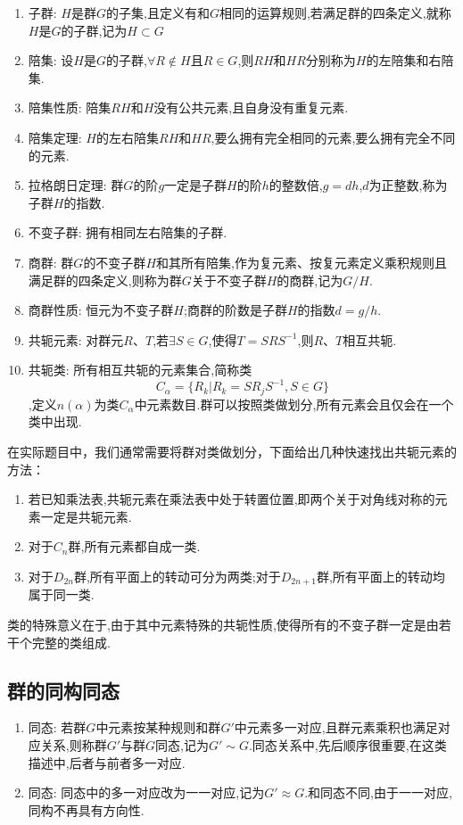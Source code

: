\documentclass{ctexart}
\begin{document}
\begin{enumerate}
    \item 子群: $H$是群$G$的子集,且定义有和$G$相同的运算规则,若满足群的四条定义,就称$H$是$G$的子群,记为$H\subset G$
    \item 陪集: 设$H$是$G$的子群,$\forall R \notin H$且$R\in G$,则$RH$和$HR$分别称为$H$的左陪集和右陪集.
    \item 陪集性质: 陪集$RH$和$H$没有公共元素,且自身没有重复元素.
    \item 陪集定理: $H$的左右陪集$RH$和$HR$,要么拥有完全相同的元素,要么拥有完全不同的元素.
    \item 拉格朗日定理: 群$G$的阶$g$一定是子群$H$的阶$h$的整数倍,$g=dh$,$d$为正整数,称为子群$H$的指数.
    \item 不变子群: 拥有相同左右陪集的子群.
    \item 商群: 群$G$的不变子群$H$和其所有陪集,作为复元素、按复元素定义乘积规则且满足群的四条定义,则称为群$G$关于不变子群$H$的商群,记为$G/H$.
    \item 商群性质: 恒元为不变子群$H$;商群的阶数是子群$H$的指数$d=g/h$.
    \item 共轭元素: 对群元$R$、$T$,若$\exists S\in G$,使得$T=SRS^{-1}$,则$R$、$T$相互共轭.
    \item 共轭类: 所有相互共轭的元素集合,简称类\[C_{\alpha}= \{ R_{k}|R_{k}=SR_{j}S^{-1},S\in G \}\],定义$n(\alpha)$为类$C_{\alpha}$中元素数目.群可以按照类做划分,所有元素会且仅会在一个类中出现.
\end{enumerate}

在实际题目中，我们通常需要将群对类做划分，下面给出几种快速找出共轭元素的方法：
\begin{enumerate}
    \item 若已知乘法表,共轭元素在乘法表中处于转置位置,即两个关于对角线对称的元素一定是共轭元素.
    \item 对于$C_{n}$群,所有元素都自成一类.
    \item 对于$D_{2n}$群,所有平面上的转动可分为两类;对于$D_{2n+1}$群,所有平面上的转动均属于同一类.
\end{enumerate}

类的特殊意义在于,由于其中元素特殊的共轭性质,使得所有的不变子群一定是由若干个完整的类组成.

\subsection{群的同构同态}

\begin{enumerate}
    \item 同态: 若群$G$中元素按某种规则和群$G'$中元素多一对应,且群元素乘积也满足对应关系,则称群$G'$与群$G$同态,记为$G'\sim G$.同态关系中,先后顺序很重要,在这类描述中,后者与前者多一对应.
    \item 同态: 同态中的多一对应改为一一对应,记为$G'\approx G$.和同态不同,由于一一对应,同构不再具有方向性.
\end{enumerate}
\end{document}
